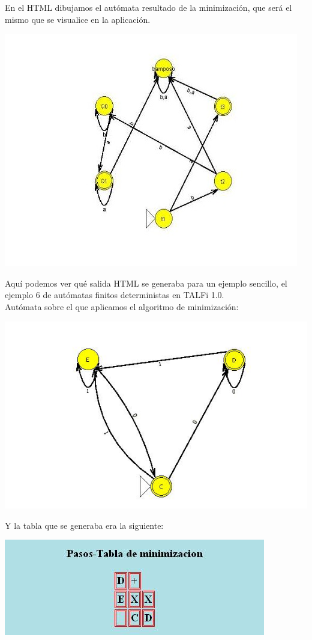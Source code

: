 \documentclass[12pt,a4paper,spanish]{book}
\begin{document}
En el HTML dibujamos el aut\'omata resultado de la minimizaci\'on, que ser\'a el mismo que se visualice en la aplicaci\'on.
\begin{center}
\includegraphics{auto3.jpg}
\end{center}

Aqu\'i podemos ver qu\'e salida HTML se generaba para un ejemplo sencillo, el ejemplo 6 de aut\'omatas finitos deterministas en TALFi 1.0.\\
Aut\'omata sobre el que aplicamos el algoritmo de minimizaci\'on:
\begin{center}
\includegraphics{autminiantigua.jpg}\\
\end{center}
Y la tabla que se generaba era la siguiente:
\begin{center}
\includegraphics{pasosminiantigua.jpg}
\end{center}
\newpage
\end{document}
